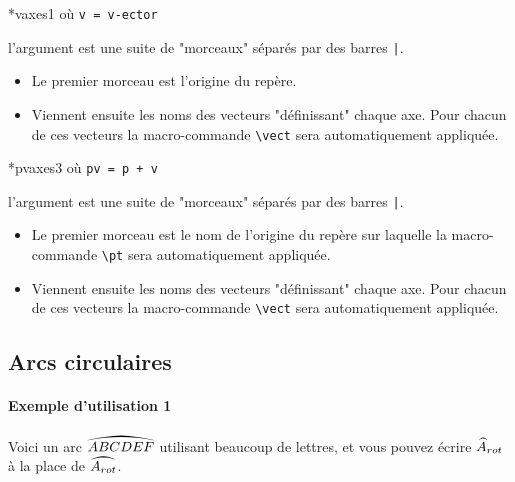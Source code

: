 \documentclass[12pt,a4paper]{scrartcl}
\makeatletter
\theoremstyle{definition}
\newcommand\IDmacro{\@ifstar{\@IDmacro@star}{\@IDmacro@no@star}}
\newcommand\@IDmacro@no@star[3]{%
    \texttt{%
    	\textbackslash#1%
    	\IfStrEq{#2}{0}{}{%
    		\,\,[#2 Option%
				\IfStrEq{#2}{1}{}{s}]%
			}%
	    \IfStrEq{#3}{}{}{%
	    		\,\,(#3 Argument%
				\IfStrEq{#3}{1}{}{s})%
			}
	   	}
    \immediate\write\tempfile{macro,#1,#2,#3}%
}
\newcommand\@IDmacro@star[2]{%
    \@IDmacro@no@star{#1}{0}{#2}%
}
\newcommand\@IDoptarg{\@ifstar{\@IDoptarg@star}{\@IDoptarg@no@star}}
\newcommand\@IDoptarg@star[2]{%
	\vspace{0.5em}
	\textbf{---} \texttt{#1%
		\IfStrEq{#2}{}{:}{\,#2:}%
	}%
}
\newcommand\@IDoptarg@no@star[2]{%
	\IfStrEq{#2}{}{%
		\@IDoptarg@star{#1}{}%
	}{%
		\@IDoptarg@star{#1}{#2}%
	}%
}
\newcommand\IDarg[1]{%
	\@IDoptarg{Argument}{#1}%
}
\makeatother
\begin{document}
\bigskip

\IDmacro*{vaxes}{1} où \quad \verb+v = v-ector+

\IDarg{} l'argument est une suite de "morceaux" séparés par des barres \verb+|+.

\begin{itemize}[topsep=0pt]
	\item Le premier morceau est l'origine du repère.
	
	\item Viennent ensuite les noms des vecteurs "définissant" chaque axe. Pour chacun de ces vecteurs la macro-commande \verb+\vect+ sera automatiquement appliquée.
\end{itemize}


\bigskip

\IDmacro*{pvaxes}{3} où \quad \verb&pv = p + v&

\IDarg{} l'argument est une suite de "morceaux" séparés par des barres \verb+|+.

\begin{itemize}[topsep=0pt]
	\item Le premier morceau est le nom de l'origine du repère sur laquelle la macro-commande \verb+\pt+ sera automatiquement appliquée.
	
	\item Viennent ensuite les noms des vecteurs "définissant" chaque axe. Pour chacun de ces vecteurs la macro-commande \verb+\vect+ sera automatiquement appliquée.
\end{itemize}





    \subsection{Arcs circulaires}

            \paragraph{Exemple d'utilisation 1}

\begin{tcblisting}{}
Voici un arc $\arc{ABCDEF}$ utilisant beaucoup de lettres, et vous pouvez écrire
$\arc*{A}{rot}$ à la place de $\arc{A_{rot}}$.
\end{tcblisting}
\end{document}
